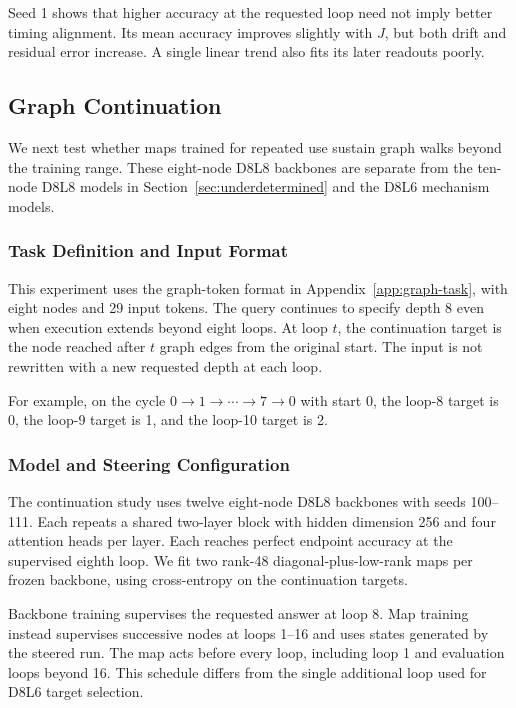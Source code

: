 \documentclass{article}
\begin{document}
Seed 1 shows that higher accuracy at the requested loop need not imply better timing alignment. Its mean accuracy improves slightly with $J$, but both drift and residual error increase. A single linear trend also fits its later readouts poorly.

\subsection{Graph Continuation}
\label{sec:boundary}
We next test whether maps trained for repeated use sustain graph walks beyond the training range. These eight-node D8L8 backbones are separate from the ten-node D8L8 models in Section~\ref{sec:underdetermined} and the D8L6 mechanism models.

\subsubsection{Task Definition and Input Format}
This experiment uses the graph-token format in Appendix~\ref{app:graph-task}, with eight nodes and 29 input tokens. The query continues to specify depth 8 even when execution extends beyond eight loops. At loop $t$, the continuation target is the node reached after $t$ graph edges from the original start. The input is not rewritten with a new requested depth at each loop.

For example, on the cycle $0\to1\to\cdots\to7\to0$ with start 0, the loop-8 target is 0, the loop-9 target is 1, and the loop-10 target is 2.

\subsubsection{Model and Steering Configuration}

The continuation study uses twelve eight-node D8L8 backbones with seeds 100--111. Each repeats a shared two-layer block with hidden dimension 256 and four attention heads per layer. Each reaches perfect endpoint accuracy at the supervised eighth loop. We fit two rank-48 diagonal-plus-low-rank maps per frozen backbone, using cross-entropy on the continuation targets.

Backbone training supervises the requested answer at loop 8. Map training instead supervises successive nodes at loops 1--16 and uses states generated by the steered run. The map acts before every loop, including loop 1 and evaluation loops beyond 16. This schedule differs from the single additional loop used for D8L6 target selection.
\end{document}
